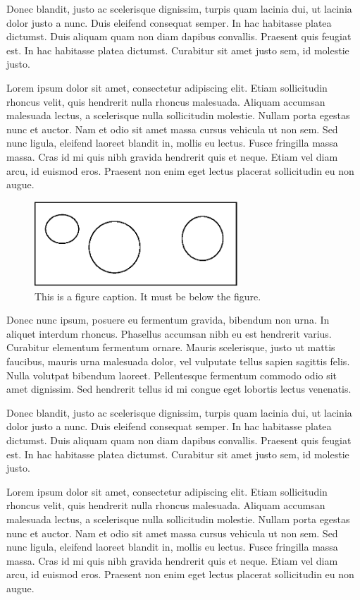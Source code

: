 \documentclass[12pt,lot,lof]{quthesis}
\begin{document}
Donec blandit, justo ac scelerisque dignissim, turpis quam lacinia dui, ut lacinia dolor justo a nunc. Duis eleifend consequat semper. In hac habitasse platea dictumst. Duis aliquam quam non diam dapibus convallis. Praesent quis feugiat est. In hac habitasse platea dictumst. Curabitur sit amet justo sem, id molestie justo.

Lorem ipsum dolor sit amet, consectetur adipiscing elit. Etiam sollicitudin rhoncus velit, quis hendrerit nulla rhoncus malesuada. Aliquam accumsan malesuada lectus, a scelerisque nulla sollicitudin molestie. Nullam porta egestas nunc et auctor. Nam et odio sit amet massa cursus vehicula ut non sem. Sed nunc ligula, eleifend laoreet blandit in, mollis eu lectus. Fusce fringilla massa massa. Cras id mi quis nibh gravida hendrerit quis et neque. Etiam vel diam arcu, id euismod eros. Praesent non enim eget lectus placerat sollicitudin eu non augue.

\begin{figure}[t]
\centering
\includegraphics[width=3in]{samplefig.eps}
\caption{This is a figure caption.  It must be below the figure.}
\end{figure}

Donec nunc ipsum, posuere eu fermentum gravida, bibendum non urna. In aliquet interdum rhoncus. Phasellus accumsan nibh eu est hendrerit varius. Curabitur elementum fermentum ornare. Mauris scelerisque, justo ut mattis faucibus, mauris urna malesuada dolor, vel vulputate tellus sapien sagittis felis. Nulla volutpat bibendum laoreet. Pellentesque fermentum commodo odio sit amet dignissim. Sed hendrerit tellus id mi congue eget lobortis lectus venenatis.

Donec blandit, justo ac scelerisque dignissim, turpis quam lacinia dui, ut lacinia dolor justo a nunc. Duis eleifend consequat semper. In hac habitasse platea dictumst. Duis aliquam quam non diam dapibus convallis. Praesent quis feugiat est. In hac habitasse platea dictumst. Curabitur sit amet justo sem, id molestie justo.

Lorem ipsum dolor sit amet, consectetur adipiscing elit. Etiam sollicitudin rhoncus velit, quis hendrerit nulla rhoncus malesuada. Aliquam accumsan malesuada lectus, a scelerisque nulla sollicitudin molestie. Nullam porta egestas nunc et auctor. Nam et odio sit amet massa cursus vehicula ut non sem. Sed nunc ligula, eleifend laoreet blandit in, mollis eu lectus. Fusce fringilla massa massa. Cras id mi quis nibh gravida hendrerit quis et neque. Etiam vel diam arcu, id euismod eros. Praesent non enim eget lectus placerat sollicitudin eu non augue.
\end{document}
